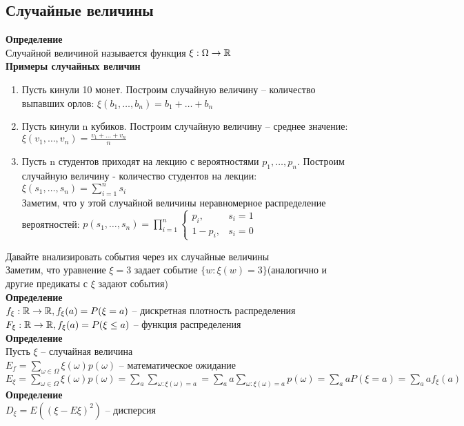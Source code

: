 \documentclass[12pt]{article}
\begin{document}
\subsection{Случайные величины}
\textbf{Определение}\\
Случайной величиной называется функция $\xi: \Omega \rightarrow \mathbb{R}$\\
\textbf{Примеры случайных величин}
\begin{enumerate}
    \item Пусть кинули 10 монет. Построим случайную величину -- количество выпавших орлов: $\xi(b_1,\ldots,b_n)=b_1+\ldots+b_n$
    \item Пусть кинули n кубиков. Построим случайную величину -- среднее значение: $\xi(v_1,\ldots,v_n)=\frac{v_1+\ldots+v_n}n$
    \item Пусть n студентов приходят на лекцию с вероятностями $p_1, \ldots, p_n$. Построим случайную величину - количество студентов на лекции: $\xi(s_1, \ldots, s_n) = \sum_{i=1}^ns_i$\\
    Заметим, что у этой случайной величины неравномерное распределение вероятностей: $p(s_1,\ldots,s_n) = \prod_{i=1}^n \left\{\begin{array}{ll}
         p_i, & s_i = 1\\
         1-p_i, & s_i = 0
    \end{array}\right.$
\end{enumerate}
Давайте внализировать события через их случайные величины\\
Заметим, что уравнение $\xi = 3$ задает событие $\{w: \xi(w) = 3\}$(аналогично и другие предикаты с $\xi$ задают события)\\
\textbf{Определение}\\
$f_\xi: \mathbb{R} \rightarrow \mathbb{R}, f_\xi(a) = P(\xi = a)$ -- дискретная плотность распределения\\
$F_\xi: \mathbb{R} \rightarrow \mathbb{R}, f_\xi(a) = P(\xi \leq a)$ -- функция распределения\\
\textbf{Определение}\\
Пусть $\xi$ -- случайная величина\\
$E_f = \sum_{\omega \in \Omega} \xi(\omega)p(\omega)$ -- математическое ожидание\\
$E_\xi = \sum_{\omega \in \Omega}\xi(\omega)p(\omega) = \sum_a\sum_{\omega: \xi(\omega) = a} = \sum_a a\sum_{\omega: \xi(\omega)=a} p(\omega) = \sum_a aP(\xi = a) = \sum_a af_\xi(a)$\\
\textbf{Определение}\\
$D_\xi = E((\xi-E\xi)^2)$ -- дисперсия\\
\end{document}
